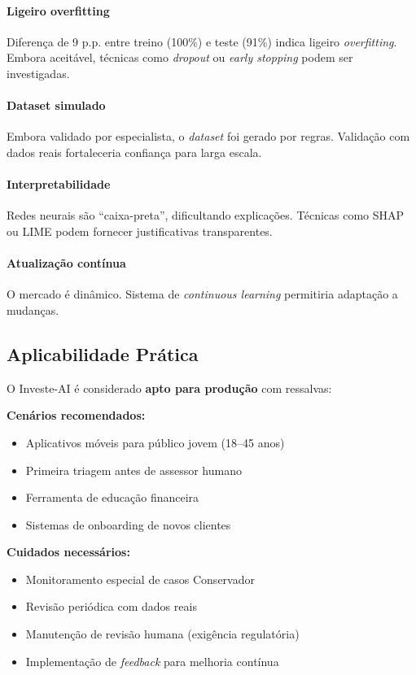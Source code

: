 \paragraph{Ligeiro overfitting} Diferença de 9 p.p. entre treino (100\%) e teste (91\%) indica ligeiro \textit{overfitting}. Embora aceitável, técnicas como \textit{dropout} ou \textit{early stopping} podem ser investigadas.

\paragraph{Dataset simulado} Embora validado por especialista, o \textit{dataset} foi gerado por regras. Validação com dados reais fortaleceria confiança para larga escala.

\paragraph{Interpretabilidade} Redes neurais são ``caixa-preta'', dificultando explicações. Técnicas como SHAP ou LIME podem fornecer justificativas transparentes.

\paragraph{Atualização contínua} O mercado é dinâmico. Sistema de \textit{continuous learning} permitiria adaptação a mudanças.

\subsection{Aplicabilidade Prática}

O Investe-AI é considerado \textbf{apto para produção} com ressalvas:

\textbf{Cenários recomendados:}
\begin{itemize}
    \item Aplicativos móveis para público jovem (18--45 anos)
    \item Primeira triagem antes de assessor humano
    \item Ferramenta de educação financeira
    \item Sistemas de onboarding de novos clientes
\end{itemize}

\textbf{Cuidados necessários:}
\begin{itemize}
    \item Monitoramento especial de casos Conservador
    \item Revisão periódica com dados reais
    \item Manutenção de revisão humana (exigência regulatória)
    \item Implementação de \textit{feedback} para melhoria contínua
\end{itemize}

